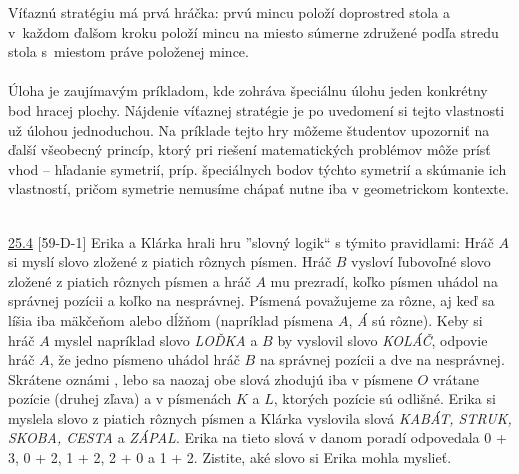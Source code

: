 \rieh Víťaznú stratégiu má prvá hráčka: prvú mincu položí doprostred stola a v~každom ďalšom kroku položí mincu na miesto súmerne združené podľa stredu stola s~miestom práve položenej mince.\\
\\
\kom Úloha je zaujímavým príkladom, kde zohráva špeciálnu úlohu jeden konkrétny bod hracej plochy. Nájdenie víťaznej stratégie je po uvedomení si tejto vlastnosti už úlohou jednoduchou. Na príklade tejto hry môžeme študentov upozorniť na ďalší všeobecný princíp, ktorý pri riešení matematických problémov môže prísť vhod -- hľadanie symetrií, príp. špeciálnych bodov týchto symetrií a skúmanie ich vlastností, pričom symetrie nemusíme chápať nutne iba v geometrickom kontexte. \\
\\
\begin{tcolorbox}[breakable,notitle,boxrule=0pt,colback=light-gray,colframe=light-gray]\ul{25.4} [59-D-1] Erika a Klárka hrali hru ”slovný logik“ s týmito pravidlami: Hráč $A$ si myslí slovo zložené z piatich rôznych písmen. Hráč $B$ vysloví ľubovoľné slovo zložené z piatich rôznych písmen a hráč $A$ mu prezradí, koľko písmen uhádol na správnej pozícii a koľko na nesprávnej. Písmená považujeme za rôzne, aj keď sa líšia iba mäkčeňom alebo dĺžňom (napríklad písmena $A$, \textit{Á} sú rôzne). Keby si hráč $A$ myslel napríklad slovo \textit{LOĎKA} a $B$ by vyslovil slovo \textit{KOLÁČ}, odpovie hráč $A$, že jedno písmeno uhádol hráč $B$ na správnej pozícii a dve na nesprávnej. Skrátene oznámi , lebo sa naozaj obe slová zhodujú iba v písmene $O$ vrátane pozície (druhej zľava) a v písmenách $K$ a $L$, ktorých pozície sú odlišné. Erika si myslela slovo z piatich rôznych písmen a Klárka vyslovila slová \textit{KABÁT, STRUK, SKOBA, CESTA} a \textit{ZÁPAL}. Erika na tieto slová v danom poradí odpovedala 0 + 3, 0 + 2, 1 + 2, 2 + 0 a 1 + 2. Zistite, aké slovo si Erika mohla myslieť.

\end{tcolorbox}

